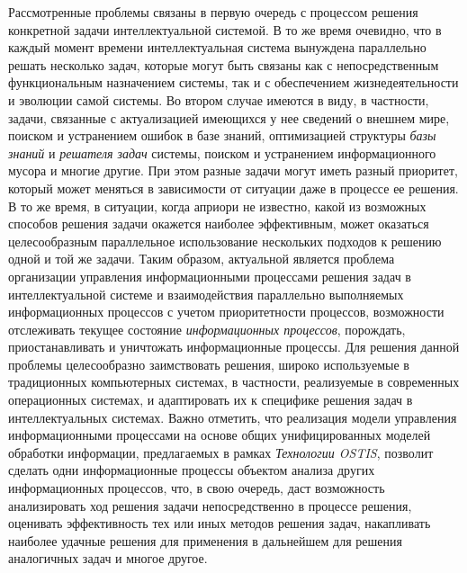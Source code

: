 Рассмотренные проблемы связаны в первую очередь с процессом решения конкретной задачи интеллектуальной системой. В то же время очевидно, что в каждый момент времени интеллектуальная система вынуждена параллельно решать несколько задач, которые могут быть связаны как с непосредственным функциональным назначением системы, так и с обеспечением жизнедеятельности и эволюции самой системы. Во втором случае имеются в виду, в частности, задачи, связанные с актуализацией имеющихся у нее сведений о внешнем мире, поиском и устранением ошибок в базе знаний, оптимизацией структуры \textit{базы знаний} и \textit{решателя задач} системы, поиском и устранением информационного мусора и многие другие. При этом разные задачи могут иметь разный приоритет, который может меняться в зависимости от ситуации даже в процессе ее решения. В то же время, в ситуации, когда априори не известно, какой из возможных способов решения задачи окажется наиболее эффективным, может оказаться целесообразным параллельное использование нескольких подходов к решению одной и той же задачи. Таким образом, актуальной является проблема организации управления информационными процессами решения задач в интеллектуальной системе и взаимодействия параллельно выполняемых информационных процессов с учетом приоритетности процессов, возможности отслеживать текущее состояние \textit{информационных процессов}, порождать, приостанавливать и уничтожать информационные процессы. Для решения данной проблемы целесообразно заимствовать решения, широко используемые в традиционных компьютерных системах, в частности, реализуемые в современных операционных системах, и адаптировать их к специфике решения задач в интеллектуальных системах. Важно отметить, что реализация модели управления информационными процессами на основе общих унифицированных моделей обработки информации, предлагаемых в рамках \textit{Технологии OSTIS}, позволит сделать одни информационные процессы объектом анализа других информационных процессов, что, в свою очередь, даст возможность анализировать ход решения задачи непосредственно в процессе решения, оценивать эффективность тех или иных методов решения задач, накапливать наиболее удачные решения для применения в дальнейшем для решения аналогичных задач и многое другое.

